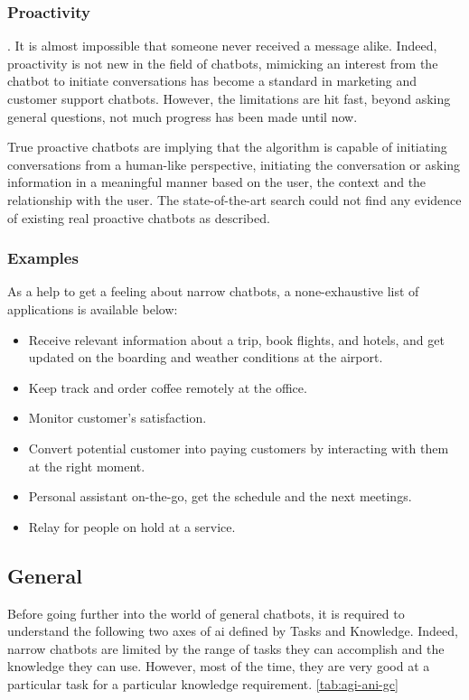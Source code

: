 \subsubsection{Proactivity}
. It is almost impossible that someone never received a message alike. Indeed, proactivity is not new in the field of chatbots, mimicking an interest from the chatbot to initiate conversations has become a standard in marketing and customer support chatbots. However, the limitations are hit fast, beyond asking general questions, not much progress has been made until now.

True proactive chatbots are implying that the algorithm is capable of initiating conversations from a human-like perspective, initiating the conversation or asking information in a meaningful manner based on the user, the context and the relationship with the user. The state-of-the-art search could not find any evidence of existing real proactive chatbots as described.


\subsubsection{Examples}
As a help to get a feeling about narrow chatbots, a none-exhaustive list of applications is available below:

\begin{itemize}
\setlength\itemsep{0em}
\item Receive relevant information about a trip, book flights, and hotels, and get updated on the boarding and weather conditions at the airport.
\item Keep track and order coffee remotely at the office.
\item Monitor customer's satisfaction.
\item Convert potential customer into paying customers by interacting with them at the right moment.
\item Personal assistant on-the-go, get the schedule and the next meetings.
\item Relay for people on hold at a service.
\end{itemize}


\subsection{General}
Before going further into the world of general chatbots, it is required to understand the following two axes of \gls{ai} defined by Tasks and Knowledge.
Indeed, narrow chatbots are limited by the range of tasks they can accomplish and the knowledge they can use. However, most of the time, they are very good at a particular task for a particular knowledge requirement. \ref{tab:agi-ani-gc}

